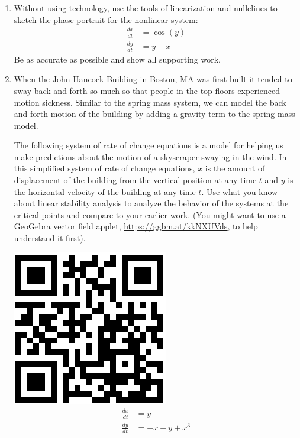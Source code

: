 \begin{enumerate}
\item Without using technology, use the tools of linearization and nullclines to sketch the phase portrait for the nonlinear system: \label{14HWproblem2}
\begin{align*}
\frac{dx}{dt} &=\cos(y) \\
\frac{dy}{dt} &=y-x
\end{align*}
Be as accurate as possible and show all supporting work.

\item When the John Hancock Building in Boston, MA was first built it tended to sway back and forth so much so that people in the top floors experienced motion sickness. Similar to the spring mass system, we can model the back and forth motion of the building by adding a gravity term to the spring mass model.
 
The following system of rate of change equations is a model for helping us make predictions about the motion of a skyscraper swaying in the wind. In this simplified system of rate of change equations, $x$ is the amount of displacement of the building from the vertical position at any time $t$ and $y$ is the horizontal velocity of the building at any time $t$. Use what you know about linear stability analysis to analyze the behavior of the systems at the critical points and compare to your earlier work. (You might want to use a GeoGebra vector field applet, \href{https://ggbm.at/kkNXUVds}{\underline{https://ggbm.at/kkNXUVds}}, to help understand it first). \label{14HWproblem3}

\vspace{-.5in}\hspace{-.6in}\includegraphics[width=.5in]{14/14VectorFieldQR.png}
\begin{align*}
\frac{dx}{dt} &=y \\
\frac{dy}{dt} &=-x-y+x^3
\end{align*}

\clearpage


\end{enumerate}
